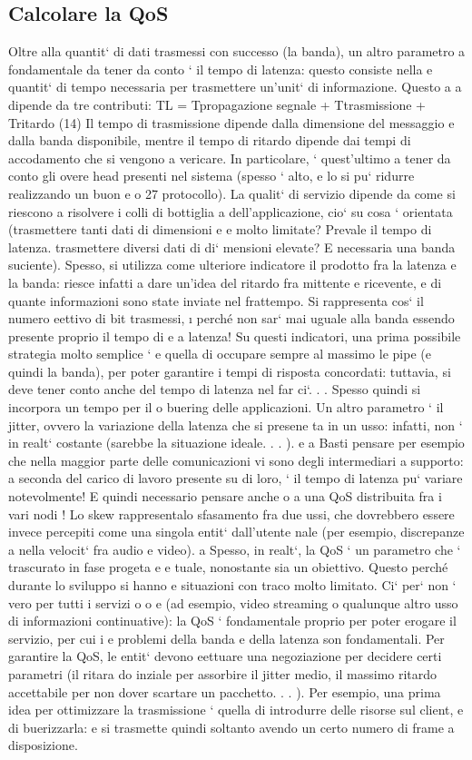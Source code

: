 \documentclass[a4paper,12pt]{article}
\begin{document}
\subsection{Calcolare la QoS}
Oltre alla quantit` di dati trasmessi con successo (la banda), un altro parametro
a
fondamentale da tener da conto ` il tempo di latenza: questo consiste nella
e
quantit` di tempo necessaria per trasmettere un'unit` di informazione. Questo
a
a
dipende da tre contributi:
TL = Tpropagazione segnale + Ttrasmissione + Tritardo
(14)
Il tempo di trasmissione dipende dalla dimensione del messaggio e dalla banda
disponibile, mentre il tempo di ritardo dipende dai tempi di accodamento che
si vengono a vericare. In particolare, ` quest'ultimo a tener da conto gli overe
head presenti nel sistema (spesso ` alto, e lo si pu` ridurre realizzando un buon
e
o
27
protocollo).
La qualit` di servizio dipende da come si riescono a risolvere i colli di bottiglia
a
dell'applicazione, cio` su cosa ` orientata (trasmettere tanti dati di dimensioni
e
e
molto limitate? Prevale il tempo di latenza. trasmettere diversi dati di di`
mensioni elevate? E necessaria una banda suciente). Spesso, si utilizza come
ulteriore indicatore il prodotto fra la latenza e la banda: riesce infatti a dare
un'idea del ritardo fra mittente e ricevente, e di quante informazioni sono state
inviate nel frattempo. Si rappresenta cos` il numero eettivo di bit trasmessi,
\i{}
perché non sar` mai uguale alla banda essendo presente proprio il tempo di
e
a
latenza! Su questi indicatori, una prima possibile strategia molto semplice `
e
quella di occupare sempre al massimo le pipe (e quindi la banda), per poter
garantire i tempi di risposta concordati: tuttavia, si deve tener conto anche
del tempo di latenza nel far ci`. . . Spesso quindi si incorpora un tempo per il
o
buering delle applicazioni.
Un altro parametro ` il jitter, ovvero la variazione della latenza che si presene
ta in un usso: infatti, non ` in realt` costante (sarebbe la situazione ideale. . . ).
e
a
Basti pensare per esempio che nella maggior parte delle comunicazioni vi sono
degli intermediari a supporto: a seconda del carico di lavoro presente su di loro,
`
il tempo di latenza pu` variare notevolmente! E quindi necessario pensare anche
o
a una QoS distribuita fra i vari nodi !
Lo skew rappresentalo sfasamento fra due ussi, che dovrebbero essere invece
percepiti come una singola entit` dall'utente nale (per esempio, discrepanze
a
nella velocit` fra audio e video).
a
Spesso, in realt`, la QoS ` un parametro che ` trascurato in fase progeta
e
e
tuale, nonostante sia un obiettivo. Questo perché durante lo sviluppo si hanno
e
situazioni con traco molto limitato. Ci` per` non ` vero per tutti i servizi
o
o
e
(ad esempio, video streaming o qualunque altro usso di informazioni continuative): la QoS ` fondamentale proprio per
poter erogare il servizio, per cui i
e
problemi della banda e della latenza son fondamentali. Per garantire la QoS, le
entit` devono eettuare una negoziazione per decidere certi parametri (il ritara
do inziale per assorbire il jitter medio, il massimo ritardo accettabile per non
dover scartare un pacchetto. . . ). Per esempio, una prima idea per ottimizzare
la trasmissione ` quella di introdurre delle risorse sul client, e di buerizzarla:
e
si trasmette quindi soltanto avendo un certo numero di frame a disposizione.
\end{document}
